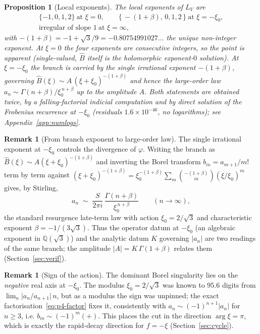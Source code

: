\documentclass[11pt,reqno]{amsart}
\renewcommand{\_}{\vquadorigunderscore\allowbreak}
\theoremstyle{plain}
\newtheorem{proposition}[theorem]{Proposition}
\theoremstyle{definition}
\newtheorem{remark}[theorem]{Remark}
\newcommand{\Bhat}{\widehat{B}}
\newcommand{\LV}{L_{V}}
\newcommand{\Qsqrt}{\mathbb{Q}(\sqrt3)}
\newcommand{\xizero}{\xi_0}
\begin{document}
\begin{proposition}[Local exponents]\label{prop:exponents}
The local exponents of $\LV$ are
\[
\begin{gathered}
  \{-1,0,1,2\}\ \text{at } \xi=0,\qquad
  \{\,-(1+\beta),\,0,1,2\,\}\ \text{at } \xi=-\xizero,\\
  \text{irregular of slope }1\ \text{at } \xi=\infty,
\end{gathered}
\]
with $-(1+\beta)=-1+\sqrt3/9=-0.80754991027\ldots$ the unique non-integer exponent. At $\xi=0$
the four exponents are consecutive integers, so the point is \emph{apparent} (single-valued, $\Bhat$
itself is the holomorphic exponent-$0$ solution). At $\xi=-\xizero$ the branch is carried by the
single irrational exponent $-(1+\beta)$, governing $\Bhat(\xi)\sim A\,(\xi+\xizero)^{-(1+\beta)}$
and hence the large-order law $a_n\sim \Gamma(n+\beta)/\xizero^{\,n+\beta}$ up to the amplitude
$A$. Both statements are obtained twice, by a falling-factorial indicial computation and by direct
solution of the Frobenius recurrence at $-\xizero$ (residuals $1.6\times10^{-46}$, no
logarithms); see Appendix~\ref{app:numlogs}.
\end{proposition}

\begin{remark}[From branch exponent to large-order law]\label{rmk:largeorder}
The single irrational exponent at $-\xizero$ controls the divergence of $\varphi$. Writing the
branch as $\Bhat(\xi)\sim A(\xi+\xizero)^{-(1+\beta)}$ and inverting the Borel transform
$b_m=a_{m+1}/m!$ term by term against $(\xi+\xizero)^{-(1+\beta)}=\xizero^{-(1+\beta)}\sum_m
\binom{-(1+\beta)}{m}(\xi/\xizero)^m$ gives, by Stirling,
\begin{equation}\label{eq:largeorder}
  a_n\;\sim\;\frac{S}{2\pi i}\,\frac{\Gamma(n+\beta)}{\xizero^{\,n+\beta}}\qquad(n\to\infty),
\end{equation}
the standard resurgence late-term law with action $\xizero=2/\sqrt3$ and characteristic exponent
$\beta=-1/(3\sqrt3)$. Thus the operator datum at $-\xizero$ (an algebraic exponent in $\Qsqrt$)
and the analytic datum $K$ governing $\lvert a_n\rvert$ are two readings of the same branch; the
amplitude $\lvert A\rvert=K\,\Gamma(1+\beta)$ relates them (Section~\ref{sec:verif}).
\end{remark}

\begin{remark}[Sign of the action]
The dominant Borel singularity lies on the \emph{negative} real axis at $-\xizero$. The modulus
$\xizero=2/\sqrt3$ was known to $95.6$ digits from $\lim_n\lvert a_n/a_{n+1}\rvert\,n$, but as a
modulus the sign was unpinned; the exact factorisation~\eqref{eq:p4-factor} fixes it, consistently
with $a_n\sim(-1)^{n+1}\lvert a_n\rvert$ for $n\ge3$, i.e. $b_m\sim(-1)^m(+)$. This places the cut
in the direction $\arg\xi=\pi$, which is exactly the rapid-decay direction for $f=-\xi$
(Section~\ref{sec:cycle}).
\end{remark}
\end{document}
